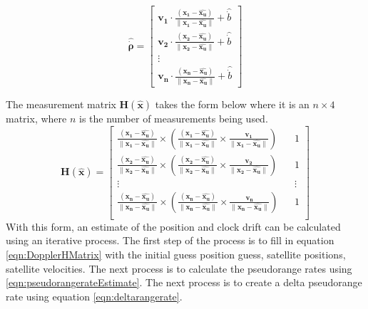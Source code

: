 \documentclass[12pt]{report}
\begin{document}
\begin{equation}
    \mathbf{\hat{\dot{\rho}}} = \begin{bmatrix} 
        \mathbf{v_1} \cdot \frac{(\mathbf{x_1} - \mathbf{\hat{x_u}})}{\| \mathbf{x_1} - \mathbf{\hat{x_u}}\|} + \hat{\dot{b}} \\ 
        \mathbf{v_2} \cdot \frac{(\mathbf{x_2} - \mathbf{\hat{x_u}})}{\| \mathbf{x_2} - \mathbf{\hat{x_u}}\|} + \hat{\dot{b}} \\ 
        \vdots \\
        \mathbf{v_n} \cdot \frac{(\mathbf{x_n} - \mathbf{\hat{x_u}})}{\| \mathbf{x_n} - \mathbf{\hat{x_u}}\|} + \hat{\dot{b}} 
    \end{bmatrix}
    \label{eqn:pseudorangerateEstimate}
\end{equation}

The measurement matrix $\mathbf{H(\mathbf{\hat{x}})}$ takes the form below where it is an $n \times 4$ matrix, where $n$ is the number of measurements being used.
\begin{equation}
\mathbf{H(\mathbf{\hat{x}})} = \begin{bmatrix}
    \frac{(\mathbf{x_1} - \mathbf{\hat{x_u}})}{\| \mathbf{x_1} - \mathbf{\hat{x_u}}\|} \times \left(\frac{(\mathbf{x_1} - \mathbf{\hat{x_u}})}{\| \mathbf{x_1} - \mathbf{\hat{x_u}}\|} \times \frac{\mathbf{v_1}}{\| \mathbf{x_1} - \mathbf{\hat{x_u}}\|}\right) && 1 \\
    \frac{(\mathbf{x_2} - \mathbf{\hat{x_u}})}{\| \mathbf{x_2} - \mathbf{\hat{x_u}}\|} \times \left(\frac{(\mathbf{x_2} - \mathbf{\hat{x_u}})}{\| \mathbf{x_2} - \mathbf{\hat{x_u}}\|} \times \frac{\mathbf{v_2}}{\| \mathbf{x_2} - \mathbf{\hat{x_u}}\|}\right) && 1 \\
    \vdots && \vdots\\
    \frac{(\mathbf{x_n} - \mathbf{\hat{x_u}})}{\| \mathbf{x_n} - \mathbf{\hat{x_u}}\|} \times \left(\frac{(\mathbf{x_n} - \mathbf{\hat{x_u}})}{\| \mathbf{x_n} - \mathbf{\hat{x_u}}\|} \times \frac{\mathbf{v_n}}{\| \mathbf{x_n} - \mathbf{\hat{x_u}}\|}\right) && 1 \\
\end{bmatrix}
\label{eqn:DopplerHMatrix}
\end{equation}
With this form, an estimate of the position and clock drift can be calculated using an iterative process. The first step of the process is to fill in equation \ref{eqn:DopplerHMatrix} with the initial guess position guess, satellite positions, satellite velocities. The next process is to calculate the pseudorange rates using \ref{eqn:pseudorangerateEstimate}. The next process is to create a delta pseudorange rate using equation \ref{eqn:deltarangerate}.
\end{document}
